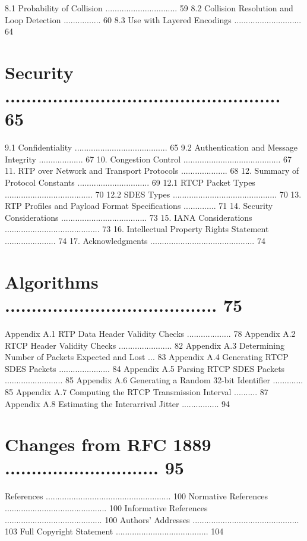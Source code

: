 \documentclass{article}
\begin{document}
8.1  Probability of Collision ...............................  59 8.2  Collision Resolution and Loop Detection ................  60 8.3  Use with Layered Encodings .............................  64

\section{Security ....................................................  65}

9.1  Confidentiality ........................................  65 9.2  Authentication and Message Integrity ...................  67 10. Congestion Control ..........................................  67 11. RTP over Network and Transport Protocols ....................  68 12. Summary of Protocol Constants ...............................  69 12.1 RTCP Packet Types ......................................  70 12.2 SDES Types .............................................  70 13. RTP Profiles and Payload Format Specifications ..............  71 14. Security Considerations .....................................  73 15. IANA Considerations .........................................  73 16. Intellectual Property Rights Statement ......................  74 17. Acknowledgments .............................................  74

\section{Algorithms ........................................  75}

Appendix A.1  RTP Data Header Validity Checks ...................  78 Appendix A.2  RTCP Header Validity Checks .......................  82 Appendix A.3  Determining Number of Packets Expected and Lost ...  83 Appendix A.4  Generating RTCP SDES Packets ......................  84 Appendix A.5  Parsing RTCP SDES Packets .........................  85 Appendix A.6  Generating a Random 32-bit Identifier .............  85 Appendix A.7  Computing the RTCP Transmission Interval ..........  87 Appendix A.8  Estimating the Interarrival Jitter ................  94

\section{Changes from RFC 1889 .............................  95}

References ...................................................... 100 Normative References ............................................ 100 Informative References .......................................... 100 Authors' Addresses .............................................. 103 Full Copyright Statement ........................................ 104
\end{document}
